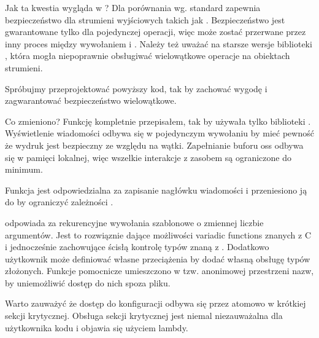 Jak ta kwestia wygląda w \Cpp{} ?
Dla porównania wg.  standard zapewnia bezpieczeństwo dla strumieni wyjściowych takich jak . Bezpieczeństwo jest gwarantowane tylko dla pojedynczej operacji, więc  może zostać przerwane przez inny proces między wywołaniem  i . Należy też uważać na starsze wersje biblioteki , która mogła niepoprawnie obsługiwać wielowątkowe operacje na obiektach strumieni.

Spróbujmy przeprojektować powyższy kod, tak by zachować wygodę  i zagwarantować bezpieczeństwo wielowątkowe.

Co zmieniono?
Funkcję  kompletnie przepisałem, tak by używała tylko biblioteki \Cpp{}. Wyświetlenie wiadomości odbywa się w pojedynczym wywołaniu  by mieć pewność że wydruk jest bezpieczny ze względu na wątki. Zapełnianie buforu oss odbywa się w pamięci lokalnej, więc wszelkie interakcje z zasobem  są ograniczone do minimum.

Funkcja  jest odpowiedzialna za zapisanie nagłówku wiadomości i przeniesiono ją do  by ograniczyć zależności .

 odpowiada za rekurencyjne wywołania szablonowe o zmiennej liczbie argumentów. Jest to rozwiąznie dające możliwości variadic functions znanych z C i jednocześnie zachowujące ścisłą kontrolę typów znaną z \Cpp{}. Dodatkowo użytkownik może definiować własne przeciążenia  by dodać własną obsługę typów złożonych. Funkcje pomocnicze umieszczono w tzw. anonimowej przestrzeni nazw, by uniemożliwić dostęp do nich spoza pliku.

Warto zauważyć że dostęp do konfiguracji odbywa się przez  atomowo w krótkiej sekcji krytycznej. Obsługa sekcji krytycznej jest niemal niezauważalna dla użytkownika kodu i objawia się użyciem lambdy.

